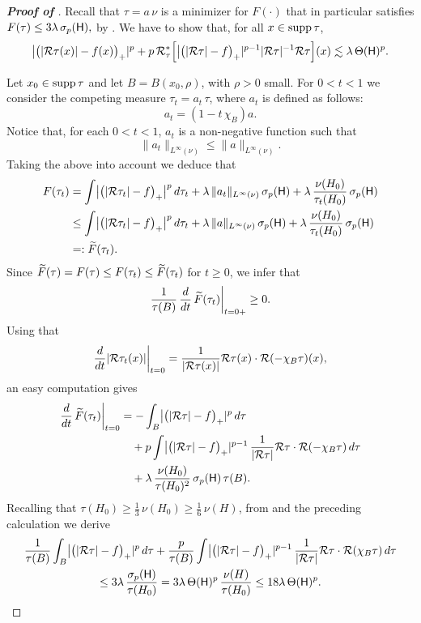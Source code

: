 \begin{proof}[\bf Proof of ]
Recall that $\tau=a\,\nu$ is a minimizer for $F(\cdot)$ that in particular satisfies
$F(\tau)\leq 3\lambda\,\sigma_p({\mathsf{H}}),$ by .
We have to show that, for all $x\in\operatorname{supp}\tau$,
$$
\bigl|\bigl(|{\mathcal R}\tau(x)| - f(x)\bigr)_+|^p + 
p \,{\mathcal R}_\tau^*\Bigl[\bigl|\bigl(|{\mathcal R}\tau| - f\bigr)_+|^{p-1} |{\mathcal R}\tau|^{-1} {\mathcal R}\tau \Bigr](x)
 \lesssim \lambda\,\Theta({\mathsf{H}})^p.
$$

Let $x_0\in\operatorname{supp}\tau$ 
and let $B=B(x_0,\rho)$, with $\rho>0$ small. For $0<t<1$ we consider the competing measure $\tau_t =
a_t\,\tau$, where $a_t$ is defined as follows:
$$a_t = (1-t\,\chi_B)a.$$
Notice that, for each $0<t<1$, $a_t$ is a non-negative function such that $$\|a_t\|_{L^\infty(\nu)}\leq \|a\|_{L^\infty(\nu)}.$$
Taking the above into account we deduce that
\begin{align*}
F(\tau_t) & = 
\int \bigl|\bigl(|{\mathcal R}\tau_t| - f\bigr)_+\bigr|^p\,d\tau_t
 + \lambda\,\|a_t\|_{L^\infty(\nu)} \,\sigma_p({\mathsf{H}}) + \lambda \,\frac{\nu(H_0)}{\tau_t(H_0)}\,\sigma_p({\mathsf{H}})\\
& \leq
\int \bigl|\bigl(|{\mathcal R}\tau_t| - f\bigr)_+\bigr|^p\,d\tau_t
 + \lambda\,\|a\|_{L^\infty(\nu)} \,\sigma_p({\mathsf{H}}) + \lambda \,\frac{\nu(H_0)}{\tau_t(H_0)}\,\sigma_p({\mathsf{H}})
\\& =:{\widetilde{F}}(\tau_t).
\end{align*}
Since ${\widetilde{F}}(\tau) = F(\tau) \leq F(\tau_t)\leq {\widetilde{F}}(\tau_t)$ for $t\geq 0$, we infer that 
\begin{equation}\label{eqvar49}
\frac1{\tau(B)}\,\frac{d}{dt}\,{\widetilde{F}}(\tau_t)\biggr|_{t=0+} \geq 0.
\end{equation}
Using that
$$
\frac d{dt}|{\mathcal R}\tau_t(x)|\biggr|_{t=0} = \frac1{|{\mathcal R}\tau(x)|} {\mathcal R}\tau(x)\cdot {\mathcal R} (-\chi_B\tau )(x)
,$$
an easy computation gives 
\begin{align*}
\frac{d}{dt}\,{\widetilde{F}}(\tau_t)\biggr|_{t=0} & = -\int_B \bigl|\bigl(|{\mathcal R}\tau| - f\bigr)_+|^p \,d\tau\\
& \quad +
p \int \bigl|\bigl(|{\mathcal R}\tau| - f\bigr)_+|^{p-1}\, \frac1{|{\mathcal R}\tau|} {\mathcal R}\tau\cdot {\mathcal R} (-\chi_B\tau)\,
d\tau \\
&\quad +  
\lambda \,\frac{\nu(H_0)}{\tau(H_0)^2}\,\sigma_p({\mathsf{H}})\,\tau(B).
\end{align*}
Recalling that $\tau(H_0)\geq\frac13\,\nu(H_0)\ge \frac16\,\nu(H)$, from  and the preceding calculation we derive
\begin{multline}\label{eqmult82}
 \frac1{\tau(B)} 
\int_B \bigl|\bigl(|{\mathcal R}\tau| - f\bigr)_+|^p \,d\tau 
 +
 \frac p{\tau(B)} \int \bigl|\bigl(|{\mathcal R}\tau| - f\bigr)_+|^{p-1}\, \frac1{|{\mathcal R}\tau|} {\mathcal R}\tau\cdot {\mathcal R} (\chi_B\tau )
\,
d\tau
 \\ 
\leq 
3\lambda \,\frac{\sigma_p({\mathsf{H}})}{\tau(H_0)} =  3\lambda\, \Theta({\mathsf{H}})^p \,\frac{\nu(H)}{\tau(H_0)} \le 18 \lambda \, \Theta({\mathsf{H}})^p.
\end{multline}



\end{proof}
